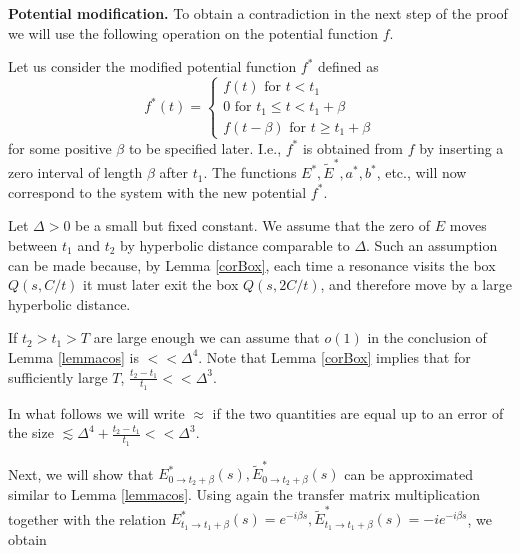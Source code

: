 \documentclass[11pt,twoside,reqno]{amsart}
\def\const{\text{\rm const}}
\def\ti{\tilde}
\def\to{\rightarrow}
\def\b{\beta}
\def\const{\text{\rm const}}
\theoremstyle{plain}
\numberwithin{equation}{section}
\begin{document}
{\bf Potential modification.} To obtain a contradiction in the next step of the proof we will use the following operation on the potential function $f$. 

Let us consider the modified potential function $f^*$ defined as 
$$f^*(t)=\begin{cases}
	f(t)\text{ for } t<t_1\\
	0\text{ for } t_1\leq t< t_1+\beta\\
	f(t-\beta)\text{ for } t\geq t_1+\beta
\end{cases}
$$
for some positive $\beta$ to be specified later. I.e., $f^*$ is obtained from $f$ by inserting a zero interval of length $\b$ after $t_1$. The functions $E^*,\ti E^*, a^*, b^*$, etc., will now correspond to the system
with the new potential $f^*$.


 Let $\Delta>0$ be a small but fixed constant. 
We assume that  the zero of $E$ moves between $t_1$ and $t_2$ by hyperbolic distance comparable to  $\Delta$. 
Such an assumption can be made because, by Lemma \ref{corBox}, each time a resonance visits the box $Q(s,C/t)$ it must later exit the box $Q(s,2C/t)$, and therefore move by a large hyperbolic distance.

If $t_2>t_1>T$ are large enough we can assume that $o(1)$ in the conclusion of Lemma \ref{lemmacos} is $<<\Delta^4$.
Note that Lemma \ref{corBox} implies that
for sufficiently large $T$,  $\frac{t_2-t_1}{t_1}<<\Delta^3$.


In what follows we will write $\approx$ if the two quantities are equal up to an error of the size $\lesssim \Delta^4+\frac{t_2-t_1}{t_1}<<\Delta^3$. 


%	

Next, we will show that  $E^*_{0\to t_2+\beta}(s), \ti E^*_{0\to t_2+\beta}(s)$ can be approximated similar to Lemma \ref{lemmacos}. 
Using again the transfer matrix multiplication together with the relation $E^*_{t_1\to t_1+\b}(s)=e^{-i\b s}, \ti E^*_{t_1\to t_1+\b}(s)=-ie^{-i\b s}$, we obtain
\end{document}
